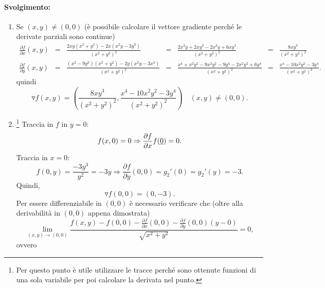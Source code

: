 \begin{example}
	 \paragraph{Svolgimento:}
	 \begin{enumerate}
	 	\item Se $(x,y)\neq (0,0)$ (è possibile calcolare il vettore gradiente perché le derivate parziali sono continue)
	 	\begin{equation*}
	 		\begin{matrix}
	 			\frac{\partial f}{\partial x} (x,y) &=& \frac{2xy(x^2+y^2) - 2x(x^2y-3y^3)}{(x^2+y^2)^2} &=& \frac{2x^3y+2xy^3-2x^3y+6xy^3}{(x^2+y^2)^2} &=& \frac{8xy^3}{(x^2+y^2)^2}\\
	 			\frac{\partial f}{\partial y} (x,y) &=& \frac{(x^2-9y^2)(x^2+y^2)-2y(x^2y-3x^3)}{(x^2+y^2)^2} &=& \frac{x^4+x^2y^2-9x^2y^2-9y^4 - 2x^2y^2 + 6y^4}{(x^2+y^2)^2} &=& \frac{x^4-10x^2y^2-3y^4}{(x^2+y^2)^2}.
	 		\end{matrix}
	 	\end{equation*}
	 	quindi
	 	\begin{equation*}
	 		\triangledown f(x,y) = \left(\frac{8xy^3}{(x^2+y^2)^2}, \frac{x^4-10x^2y^2-3y^4}{(x^2 + y^2)^2}\right)\quad (x,y)\neq(0,0).
	 	\end{equation*}
	 	\item\footnote{Per questo punto è utile utilizzare le tracce perché sono ottenute funzioni di una sola variabile per poi calcolare la derivata nel punto.} Traccia in $f$ in $y=0$:
	 	\begin{equation*}
	 		f(x,0)=0\Rightarrow \frac{\partial f}{\partial x}f(\uline 0) = 0.
	 	\end{equation*}
	 	Traccia in $x=0$:
	 	\begin{equation*}
	 		f(0,y)=\frac{-3y^3}{y^2} = -3y \Rightarrow \frac{\partial f}{\partial y}(0,0) = g_2'(0)=g_2'(y) = -3.
	 	\end{equation*}
	 	Quindi,
	 	\begin{equation*}
	 		\triangledown f(0,0)=(0,-3).
	 	\end{equation*}
	 	Per essere differenziabile in $(0,0)$ è necessario verificare che (oltre alla derivabilità in $(0,0)$ appena dimostrata)
	 	\begin{equation*}
	 		\lim_{(x,y)\rightarrow(0,0)}\frac{f(x,y)-f(0,0)-\frac{\partial f}{\partial x}(0,0)-\frac{\partial f}{\partial y}(0,0)(y-0)}{\sqrt{x^2+y^2}} = 0,
	 	\end{equation*}
	 	ovvero
	 	\begin{equation*}

\end{equation*}
\end{enumerate}
\end{example}
